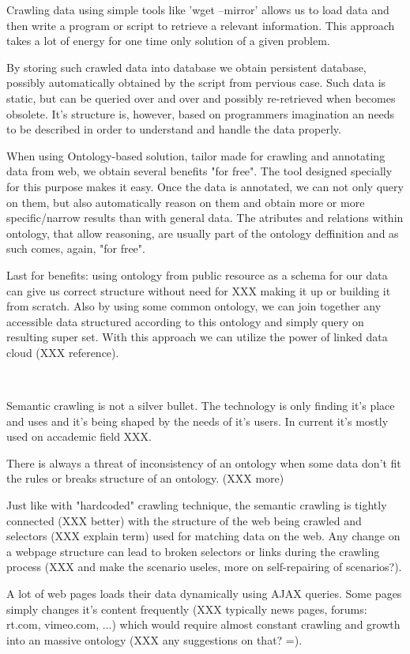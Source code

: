 Crawling data using simple tools like 'wget --mirror' allows us to load data
and then write a program or script to retrieve a relevant information. This
approach takes a lot of energy for one time only solution of a given problem. 

By storing such crawled data into database we obtain persistent database,
possibly automatically obtained by the script from pervious case. Such data is
static, but can be queried over and over and possibly re-retrieved when becomes
obsolete. It's structure is, however, based on programmers imagination an
needs to be described in order to understand and handle the data properly. 

When using Ontology-based solution, tailor made for crawling and annotating
data from web, we obtain several benefits "for free". The tool designed
specially for this purpose makes it easy. Once the data is annotated, we can
not only query on them, but also automatically reason on them and obtain more
or more specific/narrow results than with general data. The atributes and
relations within ontology, that allow reasoning, are usually part of the
ontology deffinition and as such comes, again, "for free". 

Last for benefits: using ontology from public resource as a schema for our data
can give us correct structure without need for XXX making it up or building it
from scratch. Also by using some common ontology, we can join together any
accessible data structured according to this ontology and simply query on
resulting super set. With this approach we can utilize the power of linked data
cloud (XXX reference). 

~

Semantic crawling is not a silver bullet. The technology is only finding it's
place and uses and it's being shaped by the needs of it's users. In current
it's mostly used on accademic field XXX. 

There is always a threat of inconsistency of an ontology when some data don't
fit the rules or breaks structure of an ontology. (XXX more)

Just like with "hardcoded" crawling technique, the semantic crawling is tightly
connected (XXX better) with the structure of the web being crawled and
selectors (XXX explain term) used for matching data on the web. Any change on a
webpage structure can lead to broken selectors or links during the crawling
process (XXX and make the scenario useles, more on self-repairing of
scenarios?). 

A lot of web pages loads their data dynamically using AJAX queries. Some pages
simply changes it's content frequently (XXX typically news pages, forums: rt.com,
vimeo.com, ...) which would require almost constant crawling and growth into an
massive ontology (XXX any suggestions on that? =). 

